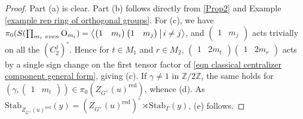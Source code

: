 \documentclass[10pt]{article}
\newcommand{\genrel}[2]{\left\langle #1\,\middle|\,#2\right\rangle}
\newcommand{\stab}[2]{\mathrm{Stab}_{#1}(#2)}
\newcommand{\Z}{\mathbb{Z}}
\newcommand{\OO}{\mathrm{O}}
\theoremstyle{definition}
\theoremstyle{remark}
\newcommand{\Zur}{Z_{G^\vee}(u)^{\mathrm{red}}}
\begin{document}
\begin{proof}
Part (a) is clear.
Part (b) follows directly from \ref{Prop2} and Example \ref{example rep ring of orthogonal groups}. For (c), we have $\pi_0(S(\prod_{m_i~\emph{even}}\OO_{m_i})=\genrel{\begin{pmatrix}1&m_i\end{pmatrix}\begin{pmatrix}1&m_j\end{pmatrix}}{i\neq j}$, and $\begin{pmatrix}1&m_j\end{pmatrix}$ acts trivially on all the $(C_2^j)^\circ$. 
Hence for $t\in M_1$ and $r\in M_2$, $\begin{pmatrix}1&2m_t\end{pmatrix}\begin{pmatrix}1&2m_r\end{pmatrix}$
acts by a single sign change on the first tensor factor of \eqref{eqn classical centralizer component general form}, giving (c). If $\gamma\neq 1$ in $\Z/2\Z$, the same holds for 
$\left(\gamma, \begin{pmatrix}1&m_t\end{pmatrix}\right)\in\pi_0(\Zur)$, whence (d). As 
$\stab{\Zur}{y}=(\Zur)^\circ\rtimes\stab{\Gamma}{y}$, (e) follows.
\end{proof}
%
\end{document}
